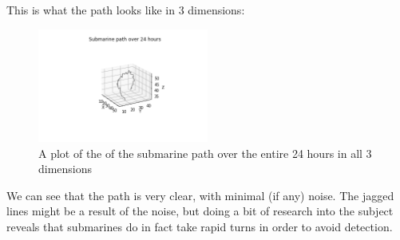 \documentclass[11pt]{amsart}
\begin{document}
This is what the path looks like in 3 dimensions: 
\begin{figure}[H]
    \centering
    \includegraphics[width=0.5\textwidth]{./images/submarine_path_3d.png}
    \caption{A plot of the of the submarine path over the 
    entire 24 hours in all 3 dimensions}
    \label{fig:sub3D}
\end{figure}

We can see that the path is very clear, with minimal (if any) noise. The jagged lines might be 
a result of the noise, but doing a bit of research into the subject reveals that submarines do 
in fact take rapid turns in order to avoid detection. 




\end{document}
